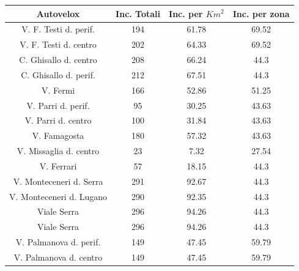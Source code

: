 \documentclass[a4paper,12pt]{report}
\begin{document}
\begin{center}
    \def\arraystretch{1.5}%
    \begin{tabular}{ |c|c|c|c| }
        \hline
        Autovelox & Inc. Totali & Inc. per $Km^2$ & Inc. per zona \\ 
        \hline
        \rowcolor{TableGray}
        V. F. Testi d. perif.\footnotemark[1]   &   194 &   61.78   &   69.52 \\
        V. F. Testi d. centro                   &   202 &   64.33   &   69.52 \\
        \rowcolor{TableGray}
        C. Ghisallo d. centro\footnotemark[2]   &   208 &   66.24   &   44.3 \\
        C. Ghisallo d. perif.                   &   212 &   67.51   &   44.3 \\
        \rowcolor{TableGray}
        V. Fermi                                &   166 &   52.86   &   51.25 \\
        V. Parri d. perif.                      &    95 &   30.25   &   43.63 \\
        \rowcolor{TableGray}
        V. Parri d. centro                      &   100 &   31.84   &   43.63 \\
        V. Famagosta                            &   180 &   57.32   &   43.63 \\
        \rowcolor{TableGray}
        V. Missaglia d. centro                  &   23  &    7.32   &   27.54 \\
        V. Ferrari                              &   57  &   18.15   &   44.3 \\
        \rowcolor{TableGray}
        V. Monteceneri d. Serra                 &   291 &   92.67   &   44.3 \\
        V. Monteceneri d. Lugano                &   290 &   92.35   &   44.3 \\
        \rowcolor{TableGray}
        Viale Serra                             &   296 &   94.26   &   44.3 \\
        Viale Serra                             &   296 &   94.26   &   44.3 \\
        \rowcolor{TableGray}
        V. Palmanova d. perif.                  &   149 &   47.45   &   59.79 \\
        V. Palmanova d. centro                  &   149 &   47.45   &   59.79 \\
        \hline
    \end{tabular}
\end{center}
\end{document}
